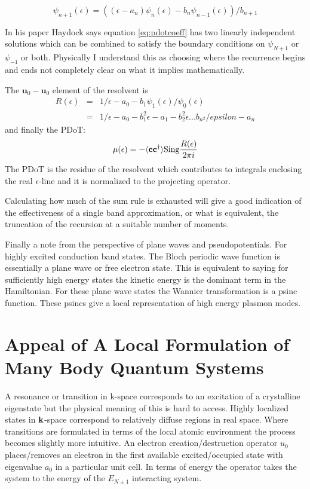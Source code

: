 \begin{equation}
\label{eq:pdotcoeff}
\psi_{n+1}(\epsilon) = ((\epsilon-a_{n})\psi_{n}(\epsilon) - b_{n}\psi_{n-1}(\epsilon))/b_{n+1}
\end{equation}

In his paper Haydock says equation \ref{eq:pdotcoeff} has two linearly independent solutions
which can be combined to satisfy the boundary conditions on $\psi_{N+1}$ or $\psi_{-1}$ or both.
Physically I understand this as choosing where the recurrence begins and ends not completely
clear on what it implies mathematically.

The $\mathbf{u}_{0}-\mathbf{u}_{0}$ element of the resolvent is
%
\begin{eqnarray}
R(\epsilon)& = & 1/\epsilon-a_{0}-b_{1}\psi_{1}(\epsilon)/\psi_{0}(\epsilon) \\
  & = & 1/\epsilon-a_{0}-b^{2}_{1}\epsilon-a_{1}-b^{2}_{2}\epsilon ... b_{n^{2}}/epsilon-a_{n}
\end{eqnarray}
%
and finally the PDoT:
%
\begin{equation}
\mu(\epsilon) = -\langle \mathbf{c} \mathbf{c}^{\dagger}\rangle {\rm Sing} \frac{R(\epsilon)}{2\pi i}
\end{equation}
%
The PDoT is the residue of the resolvent which contributes to integrals enclosing the 
real $\epsilon$-line and it is normalized to the projecting operator.

Calculating how much of the sum rule is exhausted will give a good indication
of the effectiveness of a single band approximation, or what is equivalent,
the truncation of the recursion at a suitable number of moments.

Finally a note from the perspective of plane waves and pseudopotentials. For
highly excited conduction band states. The Bloch periodic wave function is
essentially a plane wave or free electron state. This is equivalent to saying for
sufficiently high energy states the kinetic energy is the dominant term in the Hamiltonian.
For these plane wave states the Wannier transformation is a psinc function. These psincs
give a local representation of high energy plasmon modes.

\section{Appeal of A Local Formulation of Many Body Quantum Systems}
 A resonance or transition in k-space corresponds to an excitation 
of a crystalline eigenstate but the physical meaning of this is hard to access. Highly
localized states in ${\bf k}$-space correspond to relatively diffuse regions in real space. Where
transitions are formulated in terms of the local atomic environment the process becomes slightly
more intuitive. An electron creation/destruction operator $u_{0}$ places/removes an electron in the 
first available excited/occupied state with eigenvalue $a_{0}$ in a particular unit cell. 
In terms of energy the operator takes the system to the energy 
of the $E_{N\pm1}$ interacting system. 

